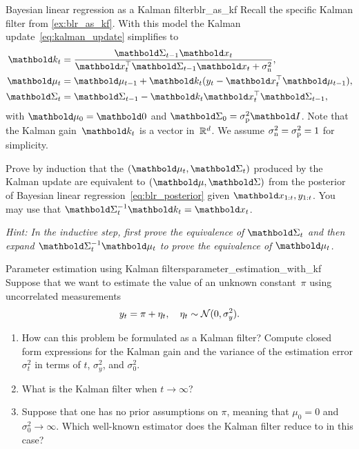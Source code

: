 \begin{nexercise}{Bayesian linear regression as a Kalman filter}{blr_as_kf}
  Recall the specific Kalman filter from \cref{ex:blr_as_kf}.
  With this model the Kalman update~\eqref{eq:kalman_update} simplifies to \begin{subequations}\begin{align}
    \vk_t &= \frac{\mSigma_{t-1} \vx_t}{\transpose{\vx_t} \mSigma_{t-1} \vx_t + \sigman^2}, \\
    \vmu_t &= \vmu_{t-1} + \vk_t (y_t - \transpose{\vx_t}\vmu_{t-1}), \\
    \mSigma_t &= \mSigma_{t-1} - \vk_t \transpose{\vx_t}\mSigma_{t-1},
  \end{align}\end{subequations} with $\vmu_0 = \vzero$ and $\mSigma_0 = \sigmap^2 \mI$.
  Note that the Kalman gain~$\vk_t$ is a vector in~$\mathbb{R}^{d}$.
  We assume $\sigma_{\mathrm{n}}^2 = \sigma_{\mathrm{p}}^2 = 1$ for simplicity.\par
  Prove by induction that the $(\vmu_t, \mSigma_t)$ produced by the Kalman update are equivalent to $(\vmu, \mSigma)$ from the posterior of Bayesian linear regression~\eqref{eq:blr_posterior} given $\vx_{1:t}, y_{1:t}$.
  You may use that $\inv{\mSigma_t} \vk_t = \vx_t$.\par
  \textit{Hint: In the inductive step, first prove the equivalence of $\mSigma_t$ and then expand $\inv{\mSigma_t} \vmu_t$ to prove the equivalence of $\vmu_t$.}
\end{nexercise}

\begin{nexercise}{Parameter estimation using Kalman filters}{parameter_estimation_with_kf}
  Suppose that we want to estimate the value of an unknown constant~$\pi$ using uncorrelated measurements \begin{align*}
    y_t = \pi + \eta_t, \quad \eta_t \sim \N{0}{\sigma_y^2}.
  \end{align*}

  \begin{enumerate}
    \item How can this problem be formulated as a Kalman filter?
    Compute closed form expressions for the Kalman gain and the variance of the estimation error $\sigma_t^2$ in terms of $t$, $\sigma_y^2$, and $\sigma_0^2$.
    \item What is the Kalman filter when $t \to \infty$?
    \item Suppose that one has no prior assumptions on $\pi$, meaning that $\mu_0 = 0$ and $\sigma_0^2 \to \infty$.
    Which well-known estimator does the Kalman filter reduce to in this case?
  \end{enumerate}
\end{nexercise}
